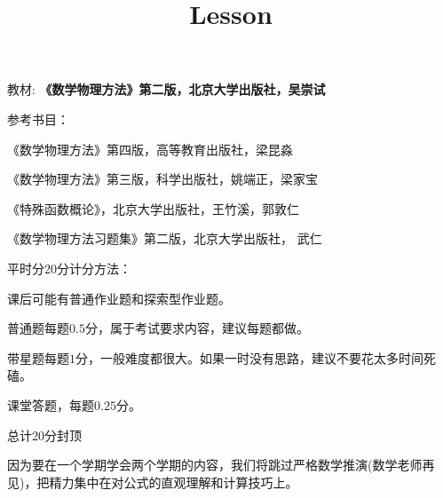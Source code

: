\documentclass[CJK]{beamer}
\title{Lesson }
\author{}
\date{}
\begin{document}

\begin{frame}
\bch
教材:
{\bf \blue《数学物理方法》第二版，北京大学出版社，吴崇试}

\skiplines

参考书目：
\bitem
\item{《数学物理方法》第四版，高等教育出版社，梁昆淼}  
\item{《数学物理方法》第三版，科学出版社，姚端正，梁家宝}
\item{《特殊函数概论》，北京大学出版社，王竹溪，郭敦仁}
\item{《数学物理方法习题集》第二版，北京大学出版社， 武仁}
  \eitem
\ech
\end{frame}


\begin{frame}
\bch
{}

平时分20分计分方法：

\bitem
\item{课后可能有普通作业题和探索型作业题。}
\item{普通题每题$0.5$分，属于考试要求内容，建议每题都做。}
\item{带星题每题$1$分，一般难度都很大。如果一时没有思路，建议不要花太多时间死磕。}
\item{课堂答题，每题$0.25$分。}
\item{总计20分封顶}  
  
\eitem

\ech
\end{frame}




\begin{frame}
\bch
因为要在一个学期学会两个学期的内容，我们将跳过严格数学推演(数学老师再见\bye)，把精力集中在对公式的直观理解和计算技巧上。

\ech
\end{frame}
\end{document}
